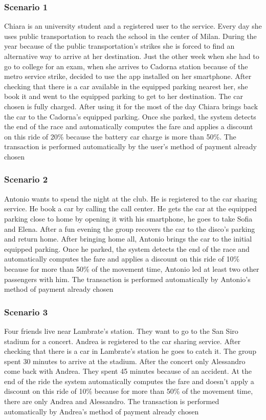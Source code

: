 \subsubsection{Scenario 1}
Chiara is an university student and a registered user to the service. Every day she uses public transportation to reach the school in the center of Milan. During the year because of the public transportation's strikes she is forced to find an alternative way to arrive at her destination.
Just the other week when she had to go to college for an exam, when she arrives to Cadorna station because of the metro service strike, decided to use the app \pej installed on her smartphone.
After checking that there is a car available in the equipped parking nearest her, she book it and went to the equipped parking to get to her destination. The car chosen is fully charged.
After using it for the most of the day Chiara brings back the car to the Cadorna's equipped parking. Once she parked, the system detects the end of the race and automatically computes the fare and applies a discount on this ride of 20\% because the battery car charge is more than 50\%. 
The transaction is performed automatically by the user's method of payment already chosen
\subsubsection{Scenario 2}
Antonio wants to spend the night at the club. He is registered to the car sharing service. He book a car by calling the call center. He gets the car at the equipped parking close to home by opening it with his smartphone, he goes to take Sofia and Elena. After a fun evening the group recovers the car to the disco's parking and return home. After bringing home all, Antonio brings the car to the initial equipped parking. Once he parked, the system detects the end of the race and automatically computes the fare and applies a discount on this ride of 10\% because for more than 50\% of the movement time, Antonio led at least two other passengers with him. The transaction is performed automatically by Antonio's method of payment already chosen
\subsubsection{Scenario 3}
Four friends live near Lambrate's station. They want to go to the San Siro stadium for a concert. Andrea is registered to the car sharing service. After checking that there is a car in Lambrate's station he goes to catch it. The group spent 30 minutes to arrive at the stadium. After the concert only Alessandro come back with Andrea. They spent 45 minutes because of an accident. At the end of the ride the system automatically computes the fare and doesn't apply a discount on this ride of 10\% because for more than 50\% of the movement time, there are only Andrea and Alessandro. The transaction is performed automatically by Andrea's method of payment already chosen
